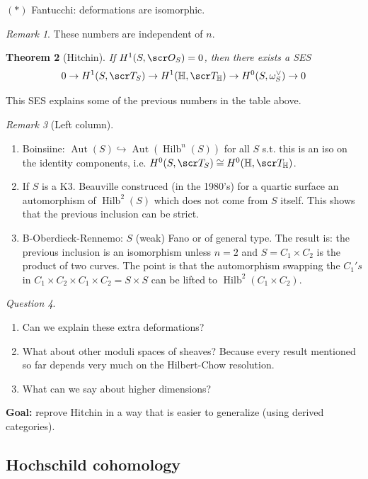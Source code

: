 \documentclass[A4paper, british, reqno]{amsart}
\theoremstyle{darkgreentheorem}
\newtheorem{thm}{Theorem}[section]
\theoremstyle{darkbluedefinition}
\theoremstyle{darkredexample}
\theoremstyle{remark}
\newtheorem{rem}[thm]{Remark}
\newtheorem{q}[thm]{Question}
\DeclareMathOperator{\Hilb}{Hilb}
\DeclareMathOperator{\Aut}{Aut}
\newcommand{\1}{\mathbbm{1}}
\newcommand{\dual}{^{\vee}}
\newcommand{\tms}{\times}
\newcommand{\mono}{\hookrightarrow}
\begin{document}
$(*)$ Fantucchi: deformations are isomorphic.

\begin{rem}
    These numbers are independent of $n$.
\end{rem}

\begin{thm}[Hitchin]
    If $H^{1}(S,\O_{S})=0$, then there exists a SES
    \[ 0\to H^{1}(S,\sT_{S})\to H^{1}(\bbH,\sT_{\bbH})\to H^{0}(S,\w_{S}\dual)\to 0 \]
\end{thm}
This SES explains some of the previous numbers in the table above.

\begin{rem}[Left column]
    \begin{enumerate}
	\item Boinsiine: $\Aut(S)\mono \Aut(\Hilb^{n}(S))$ for all $S$ s.t. this is an iso on the identity components, i.e. $H^{0}(S,\sT_{S})\cong H^{0}(\bbH,\sT_{\bbH})$.
	\item If $S$ is a K3.
	    Beauville construced (in the 1980's) for a quartic surface an automorphism of $\Hilb^{2}(S)$ which does not come from $S$ itself.
	    This shows that the previous inclusion can be strict.
	\item B-Oberdieck-Rennemo: $S$ (weak) Fano or of general type.
	    The result is: the previous inclusion is an isomorphism unless $n=2$ and $S=C_{1}\tms C_{2}$ is the product of two curves.
	    The point is that the automorphism swapping the $C_{1}'s$ in $C_{1}\times C_{2}\times C_{1}\times C_{2}=S\times S$ can be lifted to $\Hilb^{2}(C_{1}\times C_{2})$.
    \end{enumerate}
\end{rem}

\begin{q}
    \begin{enumerate}
	\item Can we explain these extra deformations?
	\item What about other moduli spaces of sheaves? Because every result mentioned so far depends very much on the Hilbert-Chow resolution.
	\item What can we say about higher dimensions?
    \end{enumerate}
\end{q}

\textbf{Goal:} reprove Hitchin in a way that is easier to generalize (using derived categories).

\subsection{Hochschild cohomology}
\end{document}
